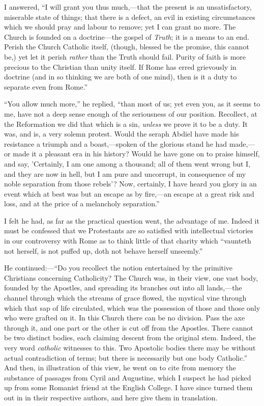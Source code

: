 I answered, ``I will grant you thus much,—that
the present is an unsatisfactory, miserable state of things; that
there is a defect, an evil in existing circumstances which we should
pray and labour to remove; yet I can grant no more. The Church is
founded on a doctrine—the gospel of \emph{Truth}; it is a means to
an end. Perish the Church Catholic itself, (though, blessed be the
promise, this cannot be,) yet let it perish \emph{rather} than the
Truth should fail. Purity of faith is more precious to the Christian
than unity itself. If Rome has erred grievously in doctrine (and in so
thinking we are both of one mind), then is it a duty to separate even
from Rome.''

``You allow much more,'' he replied, ``than most of
us; yet even you, as it seems to me, have not a deep sense enough of
the seriousness of our position. Recollect, at the Reformation we did
that which is a sin, \emph{unless} we prove it to be a duty. It was, and is,
a very solemn protest. Would the seraph Abdiel have made his
resistance a triumph and a boast,—spoken of the glorious stand
he had made,—or made it a pleasant era in his history? Would he have
gone on to praise himself, and say, 'Certainly, I am one among a
thousand; all of them went wrong but I, and they are now in hell, but
I am pure and uncorrupt, in consequence of my noble separation from
those rebels'? Now, certainly, I have heard you glory in an event
which at best was but an escape as by fire,—an escape at a great
risk and loss, and at the price of a melancholy separation.''

I felt he had, as far as the practical question
went, the advantage of me. Indeed it must be confessed that we
Protestants are so satisfied with intellectual victories in our
controversy with Rome as to think little of that charity which ``vaunteth
not herself, is not puffed up, doth not behave herself unseemly.''

He continued:—``Do you recollect the notion
entertained by the primitive Christians concerning Catholicity? The
Church was, in their view, one vast body, founded by the Apostles, and
spreading its branches out into all lands,—the channel through which
the streams of grace flowed, the mystical vine through which that sap
of life circulated, which was the possession of those and those only
who were grafted on it. In this Church there can be no division. Pass
the axe through it, and one part or the other is cut off from the
Apostles. There cannot be two distinct bodies, each claiming descent
from the original stem. Indeed, the very word \emph{catholic}
witnesses to this. Two Apostolic bodies there may be without actual
contradiction of terms; but there is necessarily but one body
Catholic.'' And then, in illustration of this view, he went on to cite
from memory the substance of passages from Cyril and Augustine, which
I suspect he had picked up from some Romanist friend at the English
College. I have since turned them out in in their respective
authors, and here give them in translation.

